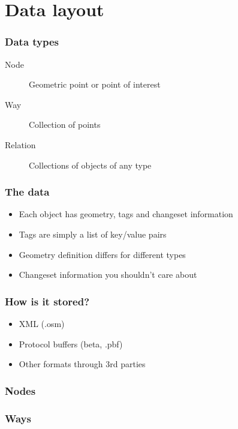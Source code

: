 \documentclass[14pt]{beamer}
\begin{document}
\section{Data layout}
\label{sec:diving}

\begin{frame}
  \frametitle{Data types}
  \begin{description}
  \item[Node] Geometric point or point of interest
  \item[Way] Collection of points
  \item[Relation] Collections of objects of any type
  \end{description}
\end{frame}

\begin{frame}
  \frametitle{The data}
  \begin{itemize}
  \item Each object has geometry, tags and changeset information
  \item Tags are simply a list of key/value pairs
  \item Geometry definition differs for different types
  \item Changeset information you shouldn't care about
  \end{itemize}
\end{frame}

\begin{frame}
  \frametitle{How is it stored?}
  \begin{itemize}
  \item XML (.osm)
  \item Protocol buffers (beta, .pbf)
  \item Other formats through 3rd parties
  \end{itemize}
\end{frame}

\begin{frame}
  \frametitle{Nodes}
\end{frame}

\begin{frame}
  \frametitle{Ways}
\end{frame}
\end{document}
